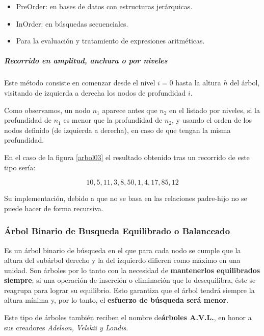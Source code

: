 \documentclass[a4paper, 11pt, titlepage]{article}
\begin{document}
            \begin{itemize}
                \item PreOrder: en bases de datos con estructuras jerárquicas.
                \item InOrder: en búsquedas secuenciales.
                \item Para la evaluación y tratamiento de expresiones aritméticas.
            \end{itemize}

            \subparagraph{Recorrido en amplitud, anchura o por niveles} Este método consiste en comenzar 
            desde el nivel $i=0$ hasta la altura $h$ del árbol, visitando de izquierda a derecha los nodos 
            de profundidad $i$.

            Como observamos, un nodo $n_1$ aparece antes 
            que $n_2$ en el listado por niveles, si la 
            profundidad de $n_1$ es menor que la profundidad de $n_2$, y usando el orden de los nodos definido 
            (de izquierda a derecha), en caso de que tengan la misma profundidad.

            En el caso de la figura \ref{arbol03} el resultado obtenido tras un recorrido de este tipo 
            sería:

            \[ 10, 5, 11, 3, 8, 50, 1, 4, 17, 85, 12 \]

            Su implementación, debido a que no se basa en las relaciones padre-hijo no se puede hacer de forma 
            recursiva.


        \subsubsection{Árbol Binario de Busqueda Equilibrado o Balanceado}

            Es un árbol binario de búsqueda en el que para cada nodo se cumple que la altura del subárbol 
            derecho y la del izquierdo difieren como máximo en una unidad. Son árboles por lo tanto con 
            la necesidad de \textbf{mantenerlos equilibrados siempre}; si una operación de inserción o 
            eliminación que lo desequilibra, éste se reagrupa para lograr su equilibrio. Esto garantiza 
            que el árbol tendrá siempre la altura mínima y, por lo tanto, el \textbf{esfuerzo de búsqueda 
            será menor}.

            Este tipo de árboles también reciben el nombre de\textbf{árboles A.V.L.}, en honor a sus creadores 
            \textit{Adelson, Velskii y Londis}.

\end{document}
